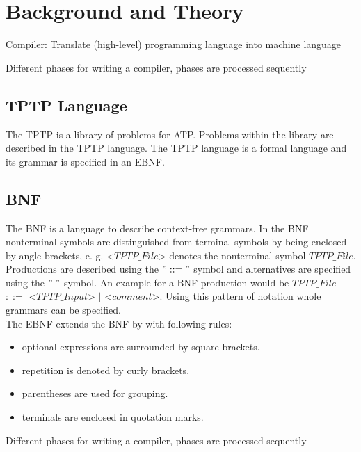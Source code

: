 
\chapter{Background and Theory}\label{cha:Background}

\cite{Mogensen.2017}
Compiler: Translate (high-level) programming language into machine language

Different phases for writing a compiler, phases are processed sequently
\section{TPTP Language}\label{sec:BackgroundTPTP}
The \acf{TPTP} is a library of problems for \ac{ATP}.
Problems within the library are described in the \ac{TPTP} language.
The  \ac{TPTP} language is a formal language and its grammar is specified in an \ac{EBNF}. \cite{Sut17}\\

\section{\acf{BNF}}\label{sec:BackgroundBNF}
The  \acf{BNF} is a language to describe context-free grammars.
In the \acf{BNF} nonterminal symbols are distinguished from terminal symbols by being enclosed by  angle brackets, e. g. <$TPTP\_File$> denotes the nonterminal symbol $TPTP\_File$.
Productions are described using the $"::="$ symbol and alternatives are specified using the $"|"$ symbol. \cite{BNF.1964} 
An example for a \ac{BNF} production would be $TPTP\_File$ $::=$ <$TPTP\_Input$> $|$ <$comment$>.
Using this pattern of notation whole grammars can be specified.\\
The \ac{EBNF} extends the \ac{BNF} by with following rules:

\begin{itemize}%
	\item optional expressions are surrounded by square brackets.
	\item repetition is denoted by curly brackets.
	\item parentheses are used for grouping.
	\item terminals are enclosed in quotation marks.
\end{itemize}
\label{itemize:BackgroundBNF}
\cite{EBNF.1977}


Different phases for writing a compiler, phases are processed sequently

